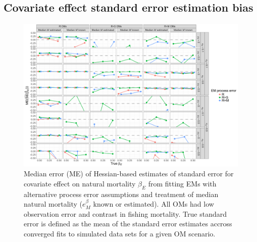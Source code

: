 \documentclass[
  12pt,
]{article}
\begin{document}
\hypertarget{covariate-effect-standard-error-estimation-bias}{%
\subsection*{Covariate effect standard error estimation bias}\label{covariate-effect-standard-error-estimation-bias}}

\begin{landscape}
\begin{figure}
\begin{center}
\includegraphics[height = \textheight]{se_beta_E_bias_main}
\end{center}
\caption{Median error (ME) of Hessian-based estimates of standard error for covariate effect on natural mortality $\beta_E$ from fitting EMs with alternative process error assumptions and treatment of median natural mortality ($e^\beta_M$ known or estimated). All OMs had low observation error and contrast in fishing mortality. True standard error is defined as the mean of the standard error estimates accross converged fits to simulated data sets for a given OM scenario.}\label{se_beta_E_bias}
\end{figure}
\end{landscape}
\end{document}
